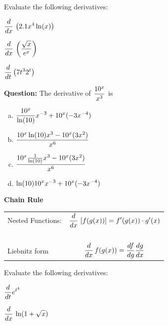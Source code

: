 \problem Evaluate the following derivatives: 

$\displaystyle \frac{d}{dx} \, \left( 2.1 x^4 \ln(x) \right)$

\vfill

\newpage

$\displaystyle \frac{d}{dx} \, \left( \frac{\sqrt{x}}{e^x} \right)$

\vfill

$\displaystyle \frac{d{}}{dt} \left( 7 t^3 2^t \right)$

\vfill

\newpage
{\bf Question: } The derivative of $\displaystyle \frac{10^x}{x^3}$ is 

\begin{enumerate}[(a)]
\item $\displaystyle   \frac{10^x}{\ln(10)} x^{-3} + 10^x (-3 x^{-4})$  \\[3ex]
\item $\displaystyle \frac{10^x \ln(10) x^3  - 10^x (3x^2)} {x^6}$ \\[3ex]
\item $\displaystyle  \frac{10^x \frac{1}{\ln(10)} x^3  - 10^x (3x^2)} {x^6}$ \\[3ex]
\item $\displaystyle  \ln(10) 10^x x^{-3} + 10^x (-3 x^{-4})$  \\[3ex]
\end{enumerate}

\newpage


\begin{boxnote}
{\bf Chain Rule}

\begin{center}
\begin{tabular}{lc}
Nested Functions: & \LARGE $\displaystyle \frac{d}{dx} \, \left[ f(g(x)) \right] = f'(g(x))\cdot g'(x)$  \\
~\\[1in]

Liebnitz form & \LARGE $\displaystyle \frac{d}{dx} \, f(g(x)) = \frac{df}{dg} \frac{dg}{dx}$ \\
\end{tabular}
\end{center}
\end{boxnote}

\newpage 

\problem Evaluate the following derivatives: 

$\displaystyle \frac{d{}}{dt} e^{t^4}$ 

\vfill

\newpage

$\displaystyle \frac{d}{dx} \,  \ln( 1+ \sqrt{x}) $

